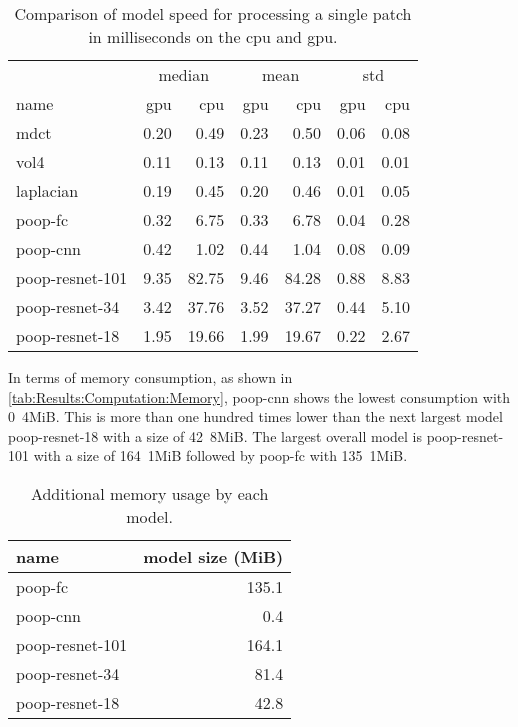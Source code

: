\begin{table}[ht]
    \centering
    \caption{Comparison of model speed for processing a single patch in milliseconds on the \ac{cpu} and \ac{gpu}.}
    \label{tab:Results:Computation:Speed}
    \begin{tabular}{@{\extracolsep{6pt}}lrrrrrr@{}}
        \hline
        \multicolumn{1}{c}{} & \multicolumn{2}{c}{median} & \multicolumn{2}{c}{mean} & \multicolumn{2}{c}{std} \\
        \cline{2-3}\cline{4-5}\cline{6-7}
        name & \acs{gpu} & \acs{cpu} & \acs{gpu} & \acs{cpu} & \acs{gpu} & \acs{cpu} \\
        \hline
        \acs{mdct}                      & 0.20 &  0.49 & 0.23 &  0.50 & 0.06 & 0.08 \\
        \acs{vol4}                      & 0.11 &  0.13 & 0.11 &  0.13 & 0.01 & 0.01 \\
        \acs{laplacian}                 & 0.19 &  0.45 & 0.20 &  0.46 & 0.01 & 0.05 \\
        \hline
        \acs{poop}-\acs{fc}             & 0.32 &  6.75 & 0.33 &  6.78 & 0.04 & 0.28 \\
        \acs{poop}-\acs{cnn}            & 0.42 &  1.02 & 0.44 &  1.04 & 0.08 & 0.09 \\
        \acs{poop}-\acs{resnet}-101     & 9.35 & 82.75 & 9.46 & 84.28 & 0.88 & 8.83 \\
        \acs{poop}-\acs{resnet}-34      & 3.42 & 37.76 & 3.52 & 37.27 & 0.44 & 5.10 \\
        \acs{poop}-\acs{resnet}-18      & 1.95 & 19.66 & 1.99 & 19.67 & 0.22 & 2.67 \\
    \end{tabular}
\end{table}

In terms of memory consumption, as shown in \autoref{tab:Results:Computation:Memory}, \ac{poop}-\ac{cnn} shows the lowest consumption with \unit{0.4}{MiB}. This is more than one hundred times lower than the next largest model \ac{poop}-\ac{resnet}-18 with a size of \unit{42.8}{MiB}. The largest overall model is \ac{poop}-\ac{resnet}-101 with a size of \unit{164.1}{MiB} followed by \ac{poop}-\ac{fc} with \unit{135.1}{MiB}.

\begin{table}[ht]
    \centering
    \caption{Additional memory usage by each model.}
    \label{tab:Results:Computation:Memory}
    \begin{tabular}{lr}
        \hline
        name & model size (MiB) \\
        \hline
        \acs{poop}-\acs{fc}         & 135.1 \\
        \acs{poop}-\acs{cnn}        &   0.4 \\
        \acs{poop}-\acs{resnet}-101 & 164.1 \\
        \acs{poop}-\acs{resnet}-34  &  81.4 \\
        \acs{poop}-\acs{resnet}-18  &  42.8 \\
    \end{tabular}
\end{table}


